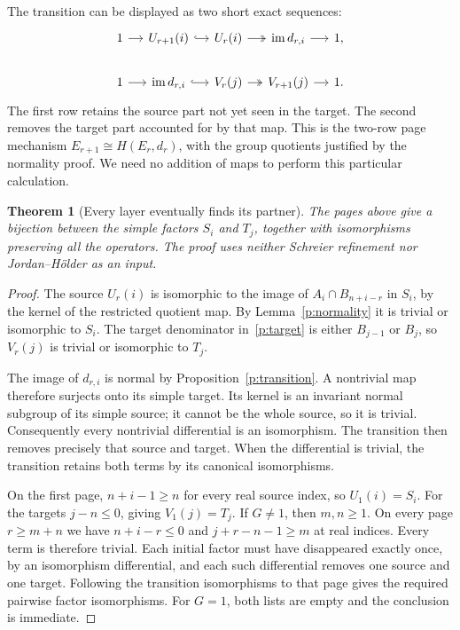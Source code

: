 \documentclass[11pt]{article}
\newtheorem{theorem}{Theorem}[section]
\theoremstyle{definition}
\theoremstyle{remark}\newtheorem{remark}[theorem]{Remark}
\DeclareMathOperator{\im}{im}
\begin{document}
The transition can be displayed as two short exact sequences:
\[
\begin{tikzcd}[column sep=small]
1\arrow[r]&U_{r+1}(i)\arrow[r,hook]&U_r(i)
 \arrow[r,two heads]&\im d_{r,i}\arrow[r]&1,\\
1\arrow[r]&\im d_{r,i}\arrow[r,hook]&V_r(j)
 \arrow[r,two heads]&V_{r+1}(j)\arrow[r]&1.
\end{tikzcd}
\]
The first row retains the source part not yet seen in the target. The
second removes the target part accounted for by that map. This is the
two-row page mechanism $E_{r+1}\cong H(E_r,d_r)$, with the group
quotients justified by the normality proof. We need no addition of maps
to perform this particular calculation.

\begin{theorem}[Every layer eventually finds its partner]\label{p:cancellation}
The pages above give a bijection between the simple factors $S_i$ and
$T_j$, together with isomorphisms preserving all the operators. The proof
uses neither Schreier refinement nor Jordan--H\"older as an input.
\end{theorem}
\begin{proof}
The source $U_r(i)$ is isomorphic to the image of $A_i\cap B_{n+i-r}$
in $S_i$, by the kernel of the restricted quotient map. By
Lemma~\ref{p:normality} it is trivial or isomorphic to $S_i$.
The target denominator in~\eqref{p:target} is either $B_{j-1}$ or
$B_j$, so $V_r(j)$ is trivial or isomorphic to $T_j$.

The image of $d_{r,i}$ is normal by Proposition~\ref{p:transition}.
A nontrivial map therefore surjects onto its simple target. Its kernel
is an invariant normal subgroup of its simple source; it cannot be the
whole source, so it is trivial. Consequently every nontrivial
differential is an isomorphism. The transition then removes precisely
that source and target. When the differential is trivial, the transition
retains both terms by its canonical isomorphisms.

On the first page, $n+i-1\geq n$ for every real source index, so
$U_1(i)=S_i$. For the targets $j-n\leq0$, giving $V_1(j)=T_j$.
If $G\neq1$, then $m,n\geq1$. On every page $r\geq m+n$ we have
$n+i-r\leq0$ and $j+r-n-1\geq m$ at real indices. Every term is
therefore trivial. Each initial factor must have disappeared exactly
once, by an isomorphism differential, and each such differential removes
one source and one target. Following the transition isomorphisms to that
page gives the required pairwise factor isomorphisms. For $G=1$, both
lists are empty and the conclusion is immediate.
\end{proof}
\end{document}
